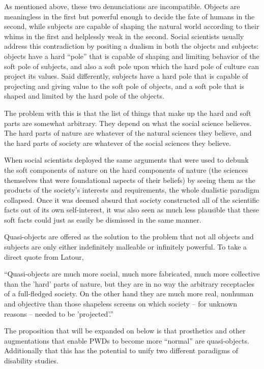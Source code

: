 \documentclass[a4paper]{article}
\begin{document}
As mentioned above, these two denunciations are incompatible. Objects are
meaningless in the first but powerful enough to decide the fate of humans in
the second, while subjects are capable of shaping the natural world according
to their whims in the first and helplessly weak in the second. Social
scientists usually address this contradiction by positing a dualism in both
the objects and subjects: objects have a hard ``pole'' that is capable of
shaping and limiting behavior of the soft pole of subjects, and also a soft
pole upon which the hard pole of culture can project its values. Said
differently, subjects have a hard pole that is capable of projecting and
giving value to the soft pole of objects, and a soft pole that is shaped and
limited by the hard pole of the objects.

The problem with this is that the list of things that make up the hard and
soft parts are somewhat arbitrary. They depend on what the social science
believes. The hard parts of nature are whatever of the natural sciences they
believe, and the hard parts of society are whatever of the social sciences
they believe. 

When social scientists deployed the same arguments that were used to debunk
the soft components of nature on the hard components of nature (the sciences
themselves that were foundational aspects of their beliefs) by seeing them as
the products of the society's interests and requirements, the whole dualistic
paradigm collapsed. Once it was deemed absurd that society constructed all of
the scientific facts out of its own self-interest, it was also seen as much
less plausible that these soft facts could just as easily be dismissed in the
same manner.

Quasi-objects are offered as the solution to the problem that not all objects
and subjects are only either indefinitely malleable or infinitely powerful. To
take a direct quote from Latour,

``Quasi-objects are much more social, much more fabricated, much more
collective than the 'hard' parts of nature, but they are in no way the
arbitrary receptacles of a full-fledged society. On the other hand they are
much more real, nonhuman and objective than those shapeless screens on which
society – for unknown reasons – needed to be 'projected'.''

The proposition that will be expanded on below is that prosthetics and other
augmentations that enable PWDs to become more ``normal'' are quasi-objects.
Additionally that this has the potential to unify two different paradigms of
disability studies. 
\end{document}
